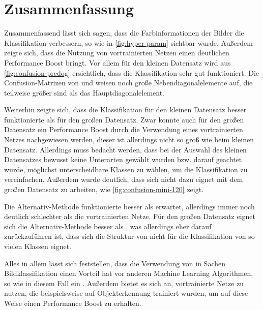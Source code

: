 \section{Zusammenfassung}
Zusammenfassend lässt sich sagen, dass die Farbinformationen der Bilder die
Klassifikation verbessern, so wie in \autoref{fig:hyper-param} sichtbar wurde.
Außerdem zeigte sich, dass die Nutzung von vortrainierten Netzen einen
deutlichen Performance Boost bringt. Vor allem für den kleinen Datensatz wird
aus \autoref{fig:confusion-predog} ersichtlich, dass die Klassifikation sehr gut
funktioniert. Die Confusion-Matrizen von \MiniDog{} und \RF{} weisen noch große
Nebendiagonalelemente auf, die teilweise größer sind als das
Hauptdiagonalelement.

Weiterhin zeigte sich, dass die Klassifikation für den kleinen Datensatz besser
funktionierte als für den großen Datensatz. Zwar konnte auch für den großen
Datensatz ein Performance Boost durch die Verwendung eines vortrainierten Netzes
nachgewiesen werden, dieser ist allerdings nicht so groß wie beim kleinen
Datensatz. Allerdings muss bedacht werden, dass bei der Auswahl des kleinen
Datensatzes bewusst keine Unterarten gewählt wurden bzw. darauf geachtet wurde,
möglichst unterscheidbare Klassen zu wählen, um die Klassifikation zu
vereinfachen. Außerdem wurde deutlich, dass sich \MiniDog{} nicht dazu eignet mit
dem großen Datensatz zu arbeiten, wie \autoref{fig:confusion-mini-120} zeigt.

Die Alternativ-Methode funktionierte besser als erwartet, allerdings immer noch
deutlich schlechter als die vortrainierten Netze. Für den großen Datensatz
eignet sich die Alternativ-Methode besser als \MiniDog{}, was allerdings eher
darauf zurückzuführen ist, dass sich die Struktur von \MiniDog{} nicht für die
Klassifikation von so vielen Klassen eignet.

Alles in allem lässt sich feststellen, dass die Verwendung von \CNN{} in
Sachen Bildklassifikation einen Vorteil hat vor anderen Machine Learning
Algorithmen, so wie in diesem Fall ein \RF{}. Außerdem bietet es sich an,
vortrainierte Netze zu nutzen, die beispielsweise auf Objekterkennung trainiert
wurden, um auf diese Weise einen Performance Boost zu erhalten.
